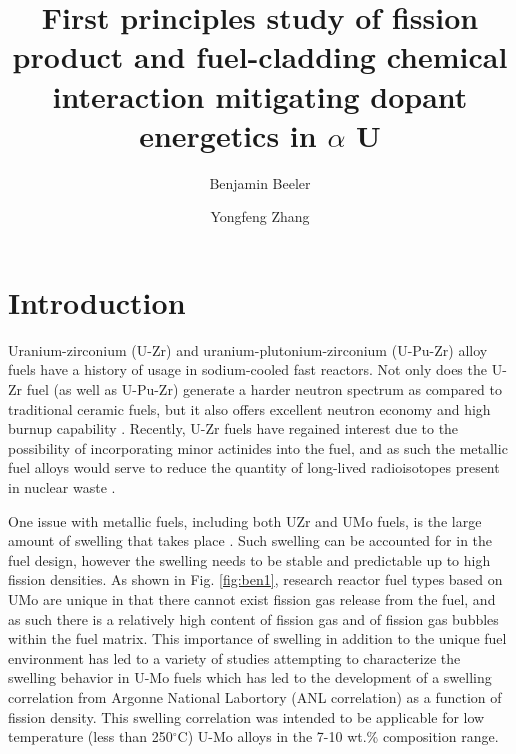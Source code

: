 \documentclass[review]{elsarticle}
\begin{document}
\begin{frontmatter}
\title{First principles study of fission product and fuel-cladding chemical interaction mitigating dopant energetics in $\alpha$ U}

\author[inl]{Benjamin Beeler}
\author[inl]{Yongfeng Zhang}
\address[inl]{Idaho National Laboratory, Idaho Falls, ID 83415}

\begin{abstract}

\end{abstract}
\end{frontmatter}

\linenumbers

\section{Introduction}

Uranium-zirconium (U-Zr) and uranium-plutonium-zirconium (U-Pu-Zr) alloy fuels have a history of usage in sodium-cooled fast reactors. Not only does the U-Zr fuel (as well as U-Pu-Zr) generate a harder neutron spectrum as compared to traditional ceramic fuels, but it also offers excellent neutron economy and high burnup capability \cite{hofman1997}. Recently, U-Zr fuels have regained interest due to the possibility of incorporating minor actinides into the fuel, and as such the metallic fuel alloys would serve to reduce the quantity of long-lived radioisotopes present in nuclear waste \cite{capriotti2017}. 

One issue with metallic fuels, including both UZr and UMo fuels, is the large amount of swelling that takes place \cite{hofman1997}. Such swelling can be accounted for in the fuel design, however the swelling needs to be stable and predictable up to high fission densities. As shown in Fig. \ref{fig:ben1}, research reactor fuel types based on UMo are unique in that there cannot exist fission gas release from the fuel, and as such there is a relatively high content of fission gas and of fission gas bubbles within the fuel matrix. This importance of swelling in addition to the unique fuel environment has led to a variety of studies attempting to characterize the swelling behavior in U-Mo fuels \cite{rest2009, kim_anl08, meyer2002, kim2013} which has led to the development of a swelling correlation from Argonne National Labortory (ANL correlation) \cite{kim2011} as a function of fission density. This swelling correlation was intended to be applicable for low temperature (less than 250$^{\circ}$C) U-Mo alloys in the 7-10 wt.\% composition range. 
\end{document}
